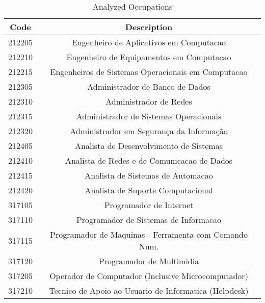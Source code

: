 \begin{table}[htbp]
	\caption{Analyzed Occupations}
	\begin{center}
		\begin{tabular}{|c|c|}
			\hline
			\textbf{Code} & \textbf{Description}                                  \\ 
			\hline
			212205           & Engenheiro de Aplicativos em Computacao               \\
			212210           & Engenheiro de Equipamentos em Computacao              \\
			212215           & Engenheiros de Sistemas Operacionais em Computacao    \\
			\hline 										
			212305           & Administrador de Banco de Dados                       \\
			212310           & Administrador de Redes                                \\
			212315           & Administrador de Sistemas Operacionais                \\
			212320           & Administrador em Segurança da Informação           \\
			\hline 									
			212405           & Analista de Desenvolvimento de Sistemas               \\
			212410           & Analista de Redes e de Comunicacao de Dados           \\
			212415           & Analista de Sistemas de Automacao                     \\
			212420           & Analista de Suporte Computacional                     \\
			\hline 									
			317105           & Programador de Internet                               \\
			317110           & Programador de Sistemas de Informacao                 \\
			317115           & Programador de Maquinas - Ferramenta com Comando Num. \\
			317120           & Programador de Multimidia                             \\
			\hline 									
			317205           & Operador de Computador (Inclusive Microcomputador)    \\
			317210           & Tecnico de Apoio ao Usuario de Informatica (Helpdesk) \\
			\hline
		\end{tabular}
		\label{ocupacoes}
	\end{center}
\end{table}

